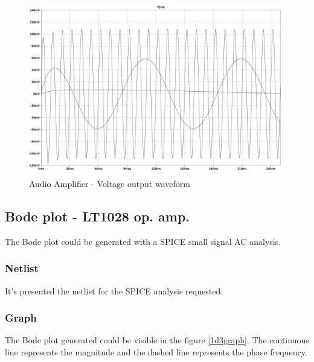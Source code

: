 \documentclass[10pt,a4paper]{article}
\begin{document}
\begin{figure}[H]
  \centering
  \includegraphics[width=14cm]{graph/1d2.jpg}
  \caption{Audio Amplifier - Voltage output waveform}
  \label{1d2graph}
\end{figure}

\subsection{Bode plot - LT1028 op. amp.}
The Bode plot could be generated with a SPICE small signal AC analysis.\par

\subsubsection{Netlist}
It's presented the netlist for the SPICE analysis requested.\\



\subsubsection{Graph}
The Bode plot generated could be visible in the figure \ref{1d3graph}. The continuous line represents the magnitude and the dashed line represents the phase frequency.\\
\end{document}
